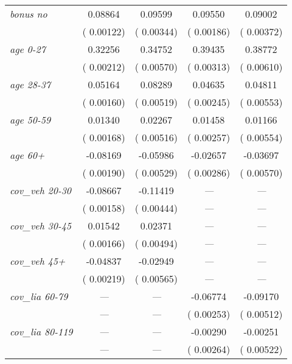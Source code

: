 {\begin{ThreePartTable}
\begin{longtable}{lcccc}
    \textit{bonus no} &  0.08864 &  0.09599 &  0.09550 &  0.09002 \\
    & \scriptsize{( 0.00122)} & \scriptsize{( 0.00344)} & \scriptsize{( 0.00186)} & \scriptsize{( 0.00372)} \\
    \textit{age 0-27} &  0.32256 &  0.34752 &  0.39435 &  0.38772 \\
    & \scriptsize{( 0.00212)} & \scriptsize{( 0.00570)} & \scriptsize{( 0.00313)} & \scriptsize{( 0.00610)} \\
    \textit{age 28-37} &  0.05164 &  0.08289 &  0.04635 &  0.04811 \\
    & \scriptsize{( 0.00160)} & \scriptsize{( 0.00519)} & \scriptsize{( 0.00245)} & \scriptsize{( 0.00553)} \\
    \textit{age 50-59} &  0.01340 &  0.02267 &  0.01458 &  0.01166 \tnote{\dag} \\
    & \scriptsize{( 0.00168)} & \scriptsize{( 0.00516)} & \scriptsize{( 0.00257)} & \scriptsize{( 0.00554)} \\
    \textit{age 60+} & -0.08169 & -0.05986 & -0.02657 & -0.03697 \\
    & \scriptsize{( 0.00190)} & \scriptsize{( 0.00529)} & \scriptsize{( 0.00286)} & \scriptsize{( 0.00570)} \\
    \textit{cov\_veh 20-30} & -0.08667 & -0.11419 & \textit{---} & \textit{---} \\
    & \scriptsize{( 0.00158)} & \scriptsize{( 0.00444)} & \scriptsize{\textit{---}} & \scriptsize{\textit{---}} \\
    \textit{cov\_veh 30-45} &  0.01542 &  0.02371 & \textit{---} & \textit{---} \\
    & \scriptsize{( 0.00166)} & \scriptsize{( 0.00494)} & \scriptsize{\textit{---}} & \scriptsize{\textit{---}} \\
    \textit{cov\_veh 45+} & -0.04837 & -0.02949 & \textit{---} & \textit{---} \\
    & \scriptsize{( 0.00219)} & \scriptsize{( 0.00565)} & \scriptsize{\textit{---}} & \scriptsize{\textit{---}} \\
    \textit{cov\_lia 60-79} & \textit{---} & \textit{---} & -0.06774 & -0.09170 \\
    & \scriptsize{\textit{---}} & \scriptsize{\textit{---}} & \scriptsize{( 0.00253)} & \scriptsize{( 0.00512)} \\
    \textit{cov\_lia 80-119} & \textit{---} & \textit{---} & -0.00290 \tnote{\dag\dag} & -0.00251 \tnote{\dag\dag} \\
    & \scriptsize{\textit{---}} & \scriptsize{\textit{---}} & \scriptsize{( 0.00264)} & \scriptsize{( 0.00522)} \\

\end{longtable}
\end{ThreePartTable}}
